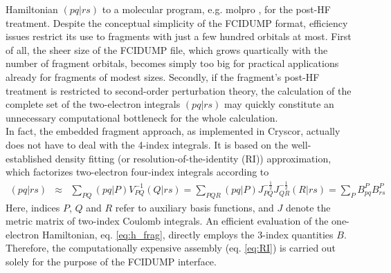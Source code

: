 \documentclass[a4paper,11pt,headings=normal]{scrartcl}
\begin{document}
\begin{itemize}
Hamiltonian  $(pq|rs)$ to a molecular program, e.g. molpro \cite{molpro}, for the 
post-HF treatment.
Despite the conceptual simplicity of the FCIDUMP format, efficiency issues 
restrict its use to fragments with just a few hundred orbitals at most. First 
of all, the sheer size of the FCIDUMP file, which grows quartically with the 
number of fragment orbitals, becomes simply too big for practical applications 
already for fragments of modest sizes. Secondly, if the fragment's post-HF 
treatment is restricted to second-order perturbation theory, the calculation 
of the complete set of the two-electron integrals $(pq|rs)$ may quickly 
constitute an unnecessary computational bottleneck for the whole calculation.\\
In fact, the embedded fragment approach, as implemented in Cryscor, actually does 
not have to deal with the 4-index integrals. It is based on the well-established
density fitting (or resolution-of-the-identity (RI)) approximation, 
which factorizes two-electron four-index integrals according 
to\autocite{Feyereisen1993}  
\begin{eqnarray}
	(pq|rs) &\approx& \sum_{PQ} (pq|P) V^{-1}_{PQ} (Q|rs) 
	= \sum_{PQR} (pq|P) J^{-\frac{1}{2}}_{PQ} J^{-\frac{1}{2}}_{QR} (R|rs)= \sum_{P} B^P_{pq} B^P_{rs} \label{eq:RI}
\end{eqnarray}
Here, indices $P$, $Q$ and $R$ refer to auxiliary basis functions, and $J$ 
denote the metric matrix of two-index Coulomb integrals. An efficient 
evaluation of the one-electron Hamiltonian, eq. \eqref{eq:h_frag}, directly 
employs the 3-index quantities $B$.\autocite{Lavroff2024} 
Therefore, the 
computationally expensive assembly (eq. \eqref{eq:RI}) is carried out 
solely for the purpose of the FCIDUMP interface. 

\end{itemize}
\end{document}
